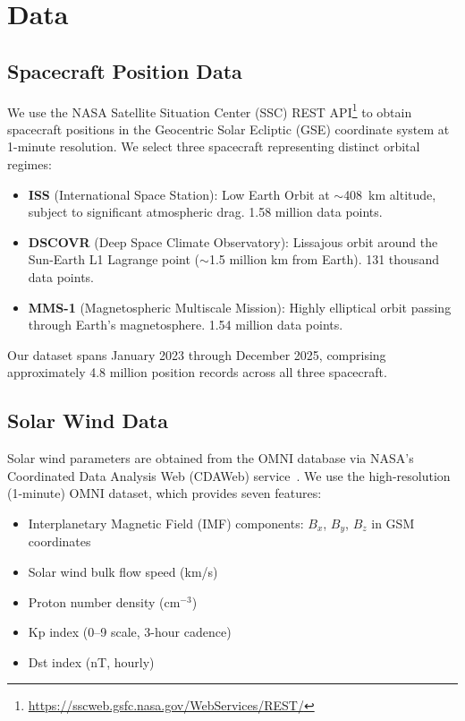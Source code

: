 \documentclass[twocolumn]{article}
\begin{document}
\section{Data}
\label{sec:data}

\subsection{Spacecraft Position Data}

We use the NASA Satellite Situation Center (SSC) REST
API\footnote{\url{https://sscweb.gsfc.nasa.gov/WebServices/REST/}} to
obtain spacecraft positions in the Geocentric Solar Ecliptic (GSE)
coordinate system at 1-minute resolution. We select three spacecraft
representing distinct orbital regimes:

\begin{itemize}
  \item \textbf{ISS} (International Space Station): Low Earth Orbit at
    $\sim$408~km altitude, subject to significant atmospheric drag.
    1.58 million data points.
  \item \textbf{DSCOVR} (Deep Space Climate Observatory): Lissajous orbit
    around the Sun-Earth L1 Lagrange point ($\sim$1.5 million km from
    Earth). 131 thousand data points.
  \item \textbf{MMS-1} (Magnetospheric Multiscale Mission): Highly
    elliptical orbit passing through Earth's magnetosphere. 1.54 million
    data points.
\end{itemize}

Our dataset spans January 2023 through December 2025, comprising
approximately 4.8 million position records across all three spacecraft.

\subsection{Solar Wind Data}

Solar wind parameters are obtained from the OMNI database via NASA's
Coordinated Data Analysis Web (CDAWeb) service~\citep{king2005solar}.
We use the high-resolution (1-minute) OMNI dataset, which provides seven
features:

\begin{itemize}
  \item Interplanetary Magnetic Field (IMF) components: $B_x$, $B_y$,
    $B_z$ in GSM coordinates
  \item Solar wind bulk flow speed (km/s)
  \item Proton number density (cm$^{-3}$)
  \item Kp index (0--9 scale, 3-hour cadence)
  \item Dst index (nT, hourly)
\end{itemize}
\end{document}
